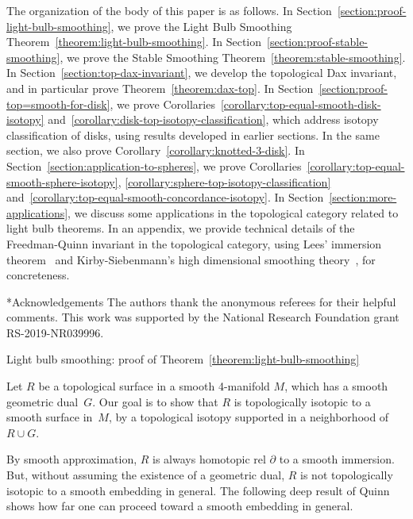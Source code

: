 \documentclass[11pt]{amsart}
\makeatletter
\def\section{\@startsection{section}{1}%
  \z@{-1.4\linespacing\@plus-.5\linespacing}{.8\linespacing}%
  {\normalfont\bfseries\Large\raggedright}}
\def\subsubsection{\@startsection{subsubsection}{3}%
  \z@{.7\linespacing\@plus.2\linespacing}{-1.5ex}%
  {\normalfont\bfseries}}
\theoremstyle{definition}
\theoremstyle{theorem-giventitle}
\theoremstyle{definition-giventitle}
\numberwithin{equation}{section}
\makeatother
\begin{document}
The organization of the body of this paper is as follows.
In Section~\ref{section:proof-light-bulb-smoothing}, we prove the Light Bulb Smoothing Theorem~\ref{theorem:light-bulb-smoothing}\@.
In Section~\ref{section:proof-stable-smoothing}, we prove the Stable Smoothing Theorem~\ref{theorem:stable-smoothing}\@.
In Section~\ref{section:top-dax-invariant}, we develop the topological Dax invariant, and in particular prove Theorem~\ref{theorem:dax-top}\@.
In Section~\ref{section:proof-top=smooth-for-disk}, we prove Corollaries~\ref{corollary:top-equal-smooth-disk-isotopy} and~\ref{corollary:disk-top-isotopy-classification}, which address isotopy classification of disks, using results developed in earlier sections.
In the same section, we also prove Corollary~\ref{corollary:knotted-3-disk}\@.
In Section~\ref{section:application-to-spheres}, we prove Corollaries~\ref{corollary:top-equal-smooth-sphere-isotopy}, \ref{corollary:sphere-top-isotopy-classification} and~\ref{corollary:top-equal-smooth-concordance-isotopy}\@.
In Section~\ref{section:more-applications}, we discuss some applications in the topological category related to light bulb theorems.
In an appendix, we provide technical details of the Freedman-Quinn invariant in the topological category, using Lees' immersion theorem~\cite{Lees:1969-1} and Kirby-Siebenmann's high dimensional smoothing theory~\cite{Kirby-Siebenmann:1977-1}, for concreteness.


\subsubsection*{Acknowledgements}
The authors thank the anonymous referees for their helpful comments.
This work was supported by the National Research Foundation grant RS-2019-NR039996.



\section{Light bulb smoothing: proof of Theorem~\ref{theorem:light-bulb-smoothing}}
\label{section:proof-light-bulb-smoothing}

Let $R$ be a topological surface in a smooth 4-manifold $M$, which has a smooth geometric dual~$G$.
Our goal is to show that $R$ is topologically isotopic to a smooth surface in~$M$, by a topological isotopy supported in a neighborhood of $R\cup G$.

By smooth approximation, $R$ is always homotopic rel $\partial$ to a smooth immersion.
But, without assuming the existence of a geometric dual, $R$ is not topologically isotopic to a smooth embedding in general.
The following deep result of Quinn~\cite{Freedman-Quinn:1990-1,Quinn:1982-1,Quinn:1984-2} shows how far one can proceed toward a smooth embedding in general.
\end{document}
